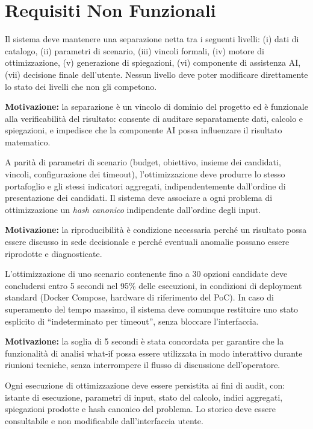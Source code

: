 \section{Requisiti Non Funzionali}

 \label{rnf:isolamento}
Il sistema deve mantenere una separazione netta tra i seguenti livelli: (i) dati di catalogo, (ii) parametri di scenario, (iii) vincoli formali, (iv) motore di ottimizzazione, (v) generazione di spiegazioni, (vi) componente di assistenza AI, (vii) decisione finale dell'utente. Nessun livello deve poter modificare direttamente lo stato dei livelli che non gli competono.

\textbf{Motivazione:} la separazione è un vincolo di dominio del progetto ed è funzionale alla verificabilità del risultato: consente di auditare separatamente dati, calcolo e spiegazioni, e impedisce che la componente AI possa influenzare il risultato matematico.

 \label{rnf:determinismo}
A parità di parametri di scenario (budget, obiettivo, insieme dei candidati, vincoli, configurazione dei timeout), l'ottimizzazione deve produrre lo stesso portafoglio e gli stessi indicatori aggregati, indipendentemente dall'ordine di presentazione dei candidati. Il sistema deve associare a ogni problema di ottimizzazione un \emph{hash canonico} indipendente dall'ordine degli input.

\textbf{Motivazione:} la riproducibilità è condizione necessaria perché un risultato possa essere discusso in sede decisionale e perché eventuali anomalie possano essere riprodotte e diagnosticate.

 \label{rnf:prestazioni}
L'ottimizzazione di uno scenario contenente fino a 30 opzioni candidate deve concludersi entro 5 secondi nel 95\% delle esecuzioni, in condizioni di deployment standard (Docker Compose, hardware di riferimento del PoC). In caso di superamento del tempo massimo, il sistema deve comunque restituire uno stato esplicito di ``indeterminato per timeout'', senza bloccare l'interfaccia.

\textbf{Motivazione:} la soglia di 5 secondi è stata concordata per garantire che la funzionalità di analisi what-if possa essere utilizzata in modo interattivo durante riunioni tecniche, senza interrompere il flusso di discussione dell'operatore.

 \label{rnf:tracciabilita}
Ogni esecuzione di ottimizzazione deve essere persistita ai fini di audit, con: istante di esecuzione, parametri di input, stato del calcolo, indici aggregati, spiegazioni prodotte e hash canonico del problema. Lo storico deve essere consultabile e non modificabile dall'interfaccia utente.

